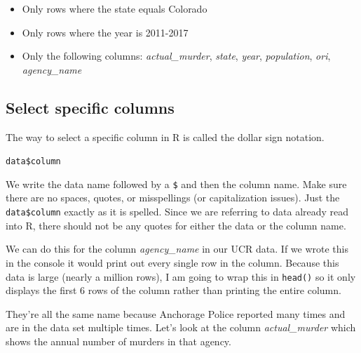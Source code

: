 \documentclass[
  12pt,
  openany]{book}
\newenvironment{Shaded}{\begin{snugshade}}{\end{snugshade}}
\newcommand{\CommentTok}[1]{\textcolor[rgb]{0.37,0.37,0.37}{\textit{#1}}}
\newcommand{\FunctionTok}[1]{\textcolor[rgb]{0,0,0}{#1}}
\newcommand{\NormalTok}[1]{#1}
\newcommand{\SpecialCharTok}[1]{\textcolor[rgb]{0,0,0}{#1}}
\providecommand{\tightlist}{%
  \setlength{\itemsep}{0pt}\setlength{\parskip}{0pt}}
\begin{document}
\begin{itemize}
\tightlist
\item
  Only rows where the state equals Colorado
\item
  Only rows where the year is 2011-2017
\item
  Only the following columns: \emph{actual\_murder}, \emph{state}, \emph{year}, \emph{population}, \emph{ori}, \emph{agency\_name}
\end{itemize}

\hypertarget{select-specific-columns}{%
\subsection{Select specific columns}\label{select-specific-columns}}

The way to select a specific column in R is called the dollar sign notation.

\texttt{data\$column}

We write the data name followed by a \texttt{\$} and then the column name. Make sure there are no spaces, quotes, or misspellings (or capitalization issues). Just the \texttt{data\$column} exactly as it is spelled. Since we are referring to data already read into R, there should not be any quotes for either the data or the column name.

We can do this for the column \emph{agency\_name} in our UCR data. If we wrote this in the console it would print out every single row in the column. Because this data is large (nearly a million rows), I am going to wrap this in \texttt{head()} so it only displays the first 6 rows of the column rather than printing the entire column.

\begin{Shaded}
\end{Shaded}

They're all the same name because Anchorage Police reported many times and are in the data set multiple times. Let's look at the column \emph{actual\_murder} which shows the annual number of murders in that agency.

\begin{Shaded}
\end{Shaded}
\end{document}

